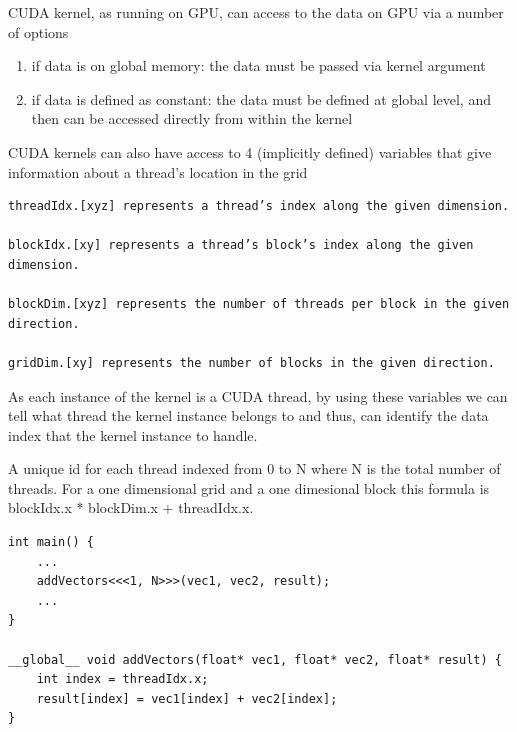 CUDA kernel, as running on GPU, can access to the data on GPU via a number of options
\begin{enumerate}
  \item if data is on global memory: the data must be passed via kernel argument
  
  \item if data is defined as constant: the data must be defined at global level, and then can be accessed directly from within the kernel
  
\end{enumerate}

CUDA kernels can also have access to 4 (implicitly defined) variables that give information about a thread’s
location in the grid

\begin{verbatim}
threadIdx.[xyz] represents a thread’s index along the given dimension.

blockIdx.[xy] represents a thread’s block’s index along the given dimension.

blockDim.[xyz] represents the number of threads per block in the given direction.

gridDim.[xy] represents the number of blocks in the given direction.
\end{verbatim}

As each instance of the kernel is a CUDA thread, by using these variables we can
tell what thread the kernel instance belongs to and thus, can identify the data index that the kernel instance to handle.

A unique id for each thread indexed from 0 to N where N is the total number of
threads. For a one dimensional grid and a one dimesional block this formula is
blockIdx.x * blockDim.x + threadIdx.x.

\begin{verbatim}
int main() {
    ...
    addVectors<<<1, N>>>(vec1, vec2, result);
    ...
}

__global__ void addVectors(float* vec1, float* vec2, float* result) {
    int index = threadIdx.x;
    result[index] = vec1[index] + vec2[index];
}
\end{verbatim}


